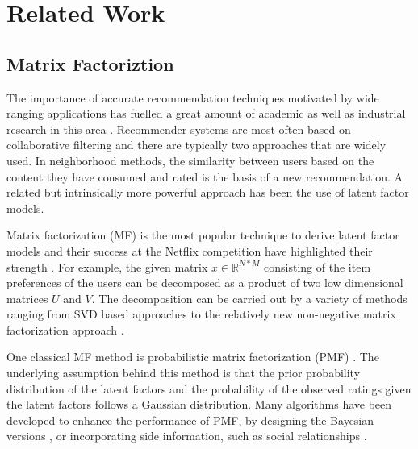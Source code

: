 \documentclass{sig-alternate-05-2015}
\begin{document}
\section{Related Work}
\subsection{Matrix Factoriztion}
The importance of accurate recommendation techniques motivated by wide ranging applications
has fuelled a great amount of academic as well as industrial research in this area \cite{ricci2011introduction}.
Recommender systems are most often based on collaborative filtering and
there are typically two approaches that are widely used.
In neighborhood methods, the similarity between users based on the content
they have consumed and rated is the basis of a new recommendation.
A related but intrinsically more powerful approach has been the use of latent factor models.

Matrix factorization (MF) is the most popular technique to derive latent factor models and
their success at the Netflix competition have highlighted their strength \cite{koren2009matrix, bennett2007netflix}.
For example, the given matrix $x \in \mathbb{R}^{N*M}$ consisting of the item preferences of the users
can be decomposed as a product of two low dimensional matrices $U$ and $V$.
The decomposition can be carried out by a variety of methods ranging from SVD based approaches \cite{mazumder2010spectral}
to the relatively new non-negative matrix factorization approach \cite{lee2001algorithms}.

One classical MF method is probabilistic matrix factorization (PMF) \cite{salakhutdinov2011probabilistic}.
The underlying assumption behind this method is that
the prior probability distribution of the latent factors and
the probability of the observed ratings given the latent factors
follows a Gaussian distribution.
Many algorithms have been developed to enhance the performance of PMF,
by designing the Bayesian versions \cite{salakhutdinov2008bayesian, xu2013fast, shi2013scmf},
or incorporating side information, such as social relationships \cite{zhao2014leveraging, ma2011recommender}.
\end{document}
